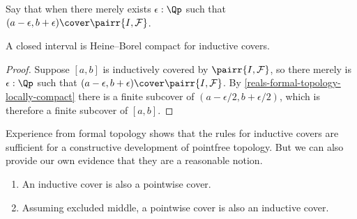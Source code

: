 Say that  when there merely exists $\epsilon : \Qp$ such that $(a - \epsilon, b +
\epsilon) \cover \pairr{I, \mathcal{F}}$.

\begin{cor} \label{interval-Heine-Borel}
  A closed interval is Heine--Borel compact for inductive covers.
\end{cor}

\begin{proof}
  Suppose $[a, b]$ is inductively covered by $\pairr{I, \mathcal{F}}$, so there merely is
  $\epsilon : \Qp$ such that $(a - \epsilon, b + \epsilon) \cover \pairr{I, \mathcal{F}}$.
  By \cref{reals-formal-topology-locally-compact} there is a finite subcover of
  $(a - \epsilon/2, b + \epsilon/2)$, which is therefore a finite subcover of $[a, b]$.
\end{proof}

Experience from formal topology shows that the rules for inductive covers are sufficient
for a constructive development of pointfree topology. But we can also provide our own
evidence that they are a reasonable notion.

\begin{thm} \label{inductive-cover-classical}
  \mbox{}
  \begin{enumerate}
  \item An inductive cover is also a pointwise cover.
  \item Assuming excluded middle, a pointwise cover is also an inductive cover.
  \end{enumerate}
\end{thm}

